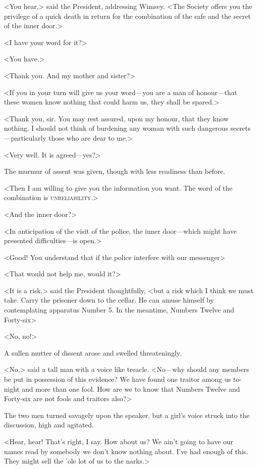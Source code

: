 <You hear,> said the President, addressing Wimsey. <The Society offers you the privilege of a quick death in return for the combination of the safe and the secret of the inner door.>

<I have your word for it?>

<You have.>

<Thank you. And my mother and sister?>

<If you in your turn will give us your word—you are a man of honour—that these women know nothing that could harm us, they shall be spared.>

<Thank you, sir. You may rest assured, upon my honour, that they know nothing. I should not think of burdening any woman with such dangerous secrets—particularly those who are dear to me.>

<Very well. It is agreed—yes?>

The murmur of assent was given, though with less readiness than before.

<Then I am willing to give you the information you want. The word of the combination is \textsc{unreliability}.>

<And the inner door?>

<In anticipation of the visit of the police, the inner door—which might have presented difficulties—is open.>

<Good! You understand that if the police interfere with our messenger\longdash>

<That would not help me, would it?>

<It is a risk,> said the President thoughtfully, <but a risk which I think we must take. Carry the prisoner down to the cellar. He can amuse himself by contemplating apparatus Number 5. In the meantime, Numbers Twelve and Forty-six\longdash>

<No, no!>

A sullen mutter of dissent arose and swelled threateningly.

<No,> said a tall man with a voice like treacle. <No—why should any members be put in possession of this evidence? We have found one traitor among us to-night and more than one fool. How are we to know that Numbers Twelve and Forty-six are not fools and traitors also?>

The two men turned savagely upon the speaker, but a girl's voice struck into the discussion, high and agitated.

<Hear, hear! That's right, I say. How about us? We ain't going to have our names read by somebody we don't know nothing about. I've had enough of this. They might sell the 'ole lot of us to the narks.>

